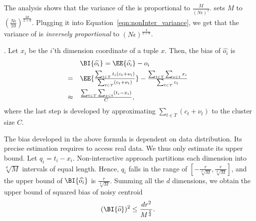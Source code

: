 The analysis shows that the variance of the \eugkm is proportional to $\frac{M}{(N\epsilon)^2}$.  \eugkm sets $M$ to $\left(\frac{N\epsilon}{10}\right )^{\frac{2d}{2+d}}$.  Plugging it into Equation~\ref{eqn:nonInter_variance}, we get that the variance of \eugkm is \emph{inversely proportional} to $\left(N\epsilon\right)^{\frac{4}{2+d}}$.

\begin{comment}
The analysis shows that the variance of non-interactive approach is proportional to $\frac{M}{(N\epsilon)^2}$.
\eugkm sets $M$ to $\left(\frac{N\epsilon}{10}\right )^{\frac{2d}{2+d}}$, and MkM sets $\left(\frac{N}{\sqrt{\log(N)}}\right )^{\frac{2d}{2+d}}$, respectively. 
Plugging them into Equation~\ref{eqn:nonInter_variance}, it follows that the variance of \eugkm is \emph{inversely proportional} to $\left(N\epsilon\right)^{\frac{4}{2+d}}$.
  while that of \mkm is \emph{inversely proportional} to $N^{\frac{4}{2+d}}\epsilon^2$. This gives a reason why \eugkm performs much better than \mkm for small $\epsilon$ values (Figure \ref{fig:non-interactive_VS_interactive}). \end{comment}
.
Let $x_i$ be the $i$'th dimension coordinate of a tuple $x$. Then, the bias of $\widehat{o_i}$ is
$$
\begin{array}{ll}
& \BI{\widehat{o_i}} = \EE{\widehat{o_i}}-o_i \vspace{1.5mm}
 \\
= & \EE{\frac{\sum_{t \in T} t_i (c_t + \nu_t)}{\sum_{t \in T} (c_t + \nu_t)}} - \frac{\sum_{t \in T} \sum_{x\in t} x_i }{\sum_{t \in T} c_t} \vspace{1.5mm}
 \\
\approx & \frac{\sum_{t \in T} \sum_{x\in t} (t_i-x_i) }{C},
\\
\end{array}
$$
where the last step is developed by approximating $\sum_{t \in T} (c_t + \nu_t)$ to the cluster size $C$.

The bias developed in the above formula is dependent on data distribution. Its precise estimation requires to access real data. We thus only estimate its upper bound. Let $q_i=t_i-x_i$. Non-interactive approach partitions each dimension into $\sqrt[d]{M}$ intervals of equal length. Hence, $q_i$ falls in the range of $[-\frac{r}{\sqrt[d]{M}}, \frac{r}{\sqrt[d]{M}}]$, and the upper bound of $\BI{\widehat{o_i}} $ is $\frac{r}{\sqrt[d]{M}}$. Summing all the $d$ dimensions, we obtain the upper bound of squared bias of noisy centroid
\begin{equation}\label{eqn:nonInter_bias2}
(\BI{\widehat{o}})^2\leq\frac{dr^2}{M^{\frac{2}{d}}}.
\end{equation}


